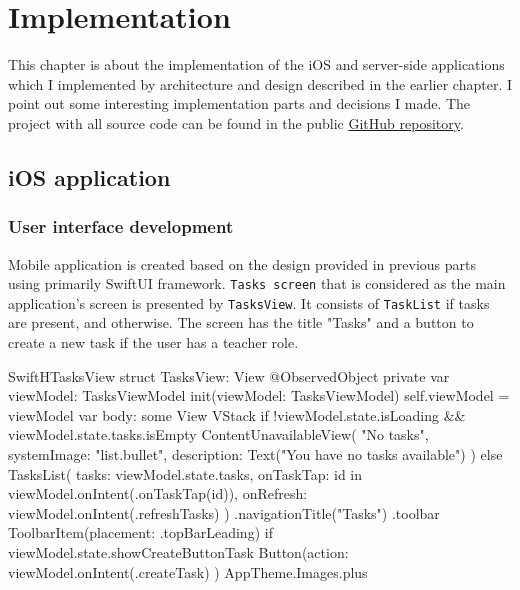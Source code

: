 \documentclass[
  biblatex = false,
  language=english,
  figures=false,
  sourcecodes,
  glossaries,
  index
]{kidiplom}
\begin{document}
\section{Implementation}
This chapter is about the implementation of the iOS and server-side applications which I implemented by architecture and design described in the earlier chapter. I point out some interesting implementation parts and decisions I made. The project with all source code can be found in the public \href{https://github.com/maxkup19/bachelor-thesis}{GitHub repository}.

\subsection{iOS application}
\subsubsection{User interface development}
Mobile application is created based on the design provided in previous parts using primarily SwiftUI framework. \texttt{Tasks screen} that is considered as the main application's screen is presented by \texttt{TasksView}. It consists of \texttt{TaskList} if tasks are present, and  otherwise. The screen has the title "Tasks" and a button to create a new task if the user has a teacher role.

\FloatBarrier
\begin{kicode}{Swift}{H}{TasksView}
struct TasksView: View {
    @ObservedObject private var viewModel: TasksViewModel
    init(viewModel: TasksViewModel) {
        self.viewModel = viewModel
    }
    var body: some View {
        VStack {
            if !viewModel.state.isLoading && viewModel.state.tasks.isEmpty {
                ContentUnavailableView(
                    "No tasks",
                    systemImage: "list.bullet",
                    description: Text("You have no tasks available")
                )
            } else {
                TasksList(
                    tasks: viewModel.state.tasks,
                    onTaskTap: { id in viewModel.onIntent(.onTaskTap(id))},
                    onRefresh: { viewModel.onIntent(.refreshTasks) }
                )
            }
        }
        .navigationTitle("Tasks")
        .toolbar {
            ToolbarItem(placement: .topBarLeading) {
                if viewModel.state.showCreateButtonTask {
                    Button(action: { viewModel.onIntent(.createTask) }) {
                        AppTheme.Images.plus
                    }
                }
            }
        }
    }
}
\end{kicode}
\FloatBarrier
\end{document}
